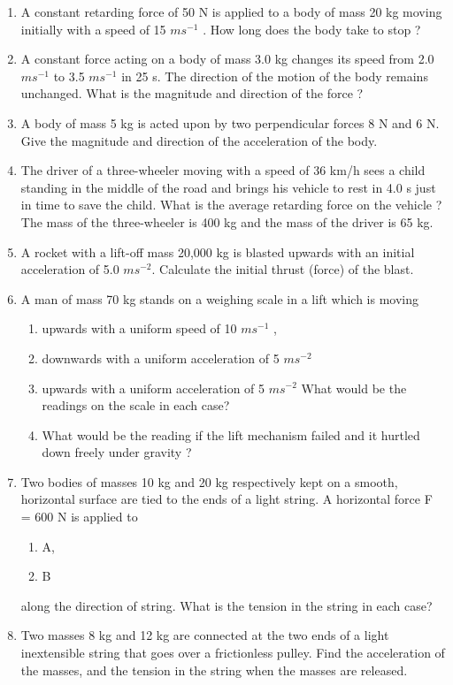 \begin{enumerate}[label=\arabic*.,ref=\thesection.\theenumi]
\item A constant retarding force of 50 N is applied to a body of mass 20 kg moving initially with a speed of 15 $m s^{-1}$
. How long does the body take to stop ?
\item  A constant force acting on a body of mass 3.0 kg changes its speed from 2.0 $m s^{-1}$ to 3.5 $m s^{-1}$
in 25 s. The direction of the motion of the body remains unchanged. What is the magnitude and direction of the force ?
\item  A body of mass 5 kg is acted upon by two perpendicular forces 8 N and 6 N. Give the magnitude and direction of the acceleration of the body.
\item  The driver of a three-wheeler moving with a speed of 36 km/h sees a child standing in the middle of the road and brings his vehicle to rest in 4.0 s just in time to save the child. What is the average retarding force on the vehicle ? The mass of the three-wheeler is 400 kg and the mass of the driver is 65 kg.
\item  A rocket with a lift-off mass 20,000 kg is blasted upwards with an initial acceleration of 5.0 $m s^{-2}$. Calculate the initial thrust (force) of the blast.
\item A man of mass 70 kg stands on a weighing scale in a lift which is moving 
\begin{enumerate}
\item upwards with a uniform speed of 10 $m s^{-1}$
,
\item downwards with a uniform acceleration of 5 $m s^{-2}$ 
\item  upwards with a uniform acceleration of 5 $m s^{-2}$ 
What would be the readings on the scale in each case?
\item What would be the reading if the lift mechanism failed and it hurtled down freely under gravity ?
\end{enumerate}
\item Two bodies of masses 10 kg and 20 kg respectively kept on a smooth, horizontal surface are tied to the ends of a light string. A horizontal force F = 600 N is applied to 
\begin{enumerate}
\item A, 
\item B 
\end{enumerate}
along the direction of string. What is the tension in the string in each case?
\item Two masses 8 kg and 12 kg are connected at the two ends of a light inextensible string that goes over a frictionless pulley. Find the acceleration of the masses, and the tension in the string when the masses are released.

\end{enumerate}

